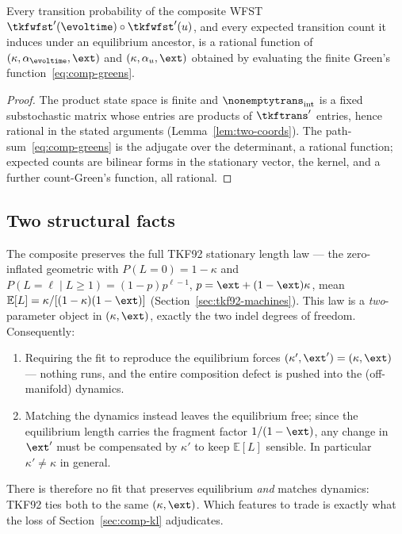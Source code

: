 \begin{proposition}
\label{prop:rational-composite}
Every transition probability of the composite WFST
$\tkfwfst'(\evoltime)\circ\tkfwfst'(\evolu)$, and every expected
transition count it induces under an equilibrium ancestor, is a rational
function of $(\kappa,\alpha_\evoltime,\ext)$ and
$(\kappa,\alpha_\evolu,\ext)$ obtained by evaluating the finite
Green's function~\eqref{eq:comp-greens}.
\end{proposition}

\begin{proof}
The product state space is finite and $\nonemptytrans_{\mathrm{int}}$ is a
fixed substochastic matrix whose entries are products of $\tkftrans'$
entries, hence rational in the stated arguments
(Lemma~\ref{lem:two-coords}).  The path-sum~\eqref{eq:comp-greens} is the
adjugate over the determinant, a rational function; expected counts are
bilinear forms in the stationary vector, the kernel, and a further
count-Green's function, all rational.
\end{proof}

\subsection{Two structural facts}

\begin{proposition}
\label{prop:equilibrium}
The composite preserves the full TKF92 stationary length law --- the
zero-inflated geometric with $P(L{=}0)=1-\kappa$ and
$P(L{=}\ell\mid L{\geq}1)=(1-p)p^{\ell-1}$,
$p=\ext+(1-\ext)\kappa$, mean
$\mathbb{E}[L]=\kappa/[(1-\kappa)(1-\ext)]$
(Section~\ref{sec:tkf92-machines}).  This law is a \emph{two}-parameter
object in $(\kappa,\ext)$, exactly the two indel degrees of freedom.
Consequently:
\begin{enumerate}[nosep]
\item Requiring the fit to reproduce the equilibrium forces
  $(\kappa',\ext')=(\kappa,\ext)$ --- nothing runs, and the entire
  composition defect is pushed into the (off-manifold) dynamics.
\item Matching the dynamics instead leaves the equilibrium free; since the
  equilibrium length carries the fragment factor $1/(1-\ext)$, any change
  in $\ext'$ must be compensated by $\kappa'$ to keep $\mathbb{E}[L]$
  sensible.  In particular $\kappa'\neq\kappa$ in general.
\end{enumerate}
There is therefore no fit that preserves equilibrium \emph{and} matches
dynamics: TKF92 ties both to the same $(\kappa,\ext)$.  Which features to
trade is exactly what the loss of Section~\ref{sec:comp-kl} adjudicates.
\end{proposition}


